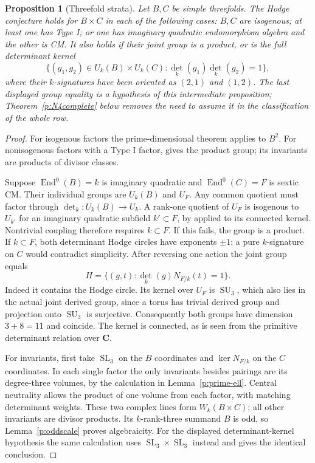 \documentclass[10pt,reqno]{article}
\theoremstyle{emphasizedplain}
\newtheorem{proposition}[theorem]{Proposition}
\theoremstyle{emphasizeddefinition}
\theoremstyle{emphasizeddefinition}
\DeclareMathOperator{\End}{End}
\DeclareMathOperator{\SL}{SL}
\DeclareMathOperator{\SU}{SU}
\newcommand{\C}{\mathbf C}
\begin{document}
\begin{proposition}[Threefold strata]\label{p:N4strata}
Let $B,C$ be simple threefolds. The Hodge conjecture holds for $B\times C$
in each of the following cases: $B,C$ are isogenous; at least one has
Type I; or one has imaginary quadratic endomorphism algebra and the
other is CM. It also holds if their joint group is a product, or is the
full determinant kernel
\[
 \{(g_1,g_2)\in U_k(B)\times U_k(C):\det_k(g_1)\det_k(g_2)=1\},
\]
where their $k$-signatures have been oriented as $(2,1)$ and $(1,2)$.
The last displayed group equality is a hypothesis of this intermediate
proposition; Theorem~\ref{p:N4complete} below removes the need to
assume it in the classification of the whole row.
\end{proposition}
\begin{proof}
For isogenous factors the prime-dimensional theorem applies to $B^2$.
For nonisogenous factors with a Type I factor,
\cite[Proposition (2.4), Lemma (3.4)]{MZ} gives the product group;
its invariants are products of divisor classes.

Suppose $\End^0(B)=k$ is imaginary quadratic and $\End^0(C)=F$ is
sextic CM. Their individual groups are $U_k(B)$ and $U_F$.
Any common quotient must factor through $\det_k:U_k(B)\to U_k$.
A rank-one quotient of $U_F$ is isogenous to $U_{k'}$ for an imaginary
quadratic subfield $k'\subset F$, by \cite[Lemma (3.7)]{MZ} applied
to its connected kernel. Nontrivial coupling therefore requires
$k\subset F$. If this fails, the group is a product.
If $k\subset F$, both determinant Hodge circles have exponents $\pm1$:
a pure $k$-signature on $C$ would contradict simplicity.
After reversing one action the joint group equals
\[
 H=\{(g,t):\det_k(g)N_{F/k}(t)=1\}.
\]
Indeed it contains the Hodge circle. Its kernel over $U_F$ is $\SU_3$,
which also lies in the actual joint derived group, since a torus has
trivial derived group and projection onto $\SU_3$ is surjective.
Consequently both groups have dimension $3+8=11$ and coincide.
The kernel is connected, as is seen from the primitive determinant
relation over $\C$.

For invariants, first take $\SL_3$ on the $B$ coordinates and
$\ker N_{F/k}$ on the $C$ coordinates. In each single factor the only
invariants besides pairings are its degree-three volumes, by the
calculation in Lemma~\ref{p:prime-ell}. Central neutrality allows the
product of one volume from each factor, with matching determinant
weights. These two complex lines form $W_k(B\times C)$; all other
invariants are divisor products. Its $k$-rank-three summand $B$ is odd,
so Lemma~\ref{p:oddscale} proves algebraicity.
For the displayed determinant-kernel hypothesis the same calculation
uses $\SL_3\times\SL_3$ instead and gives the identical conclusion.
\end{proof}
\end{document}
